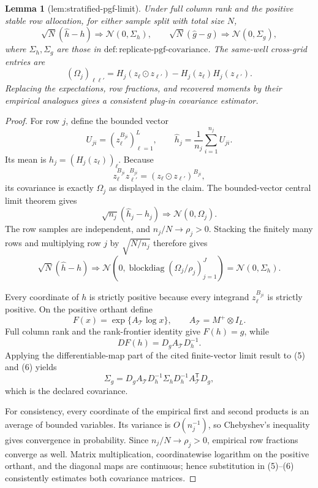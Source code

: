 \documentclass{article}
\newtheorem{lemma}{Lemma}
\begin{document}
\begin{lemma}[lem:stratified-pgf-limit]\label{lem:stratified-pgf-limit}
Under full column rank and the positive stable row allocation, for either sample split with total size \(N\),
\[
\sqrt N(\widehat h-h)\Rightarrow\mathcal N(0,\Sigma_h),
\qquad
\sqrt N(\widehat g-g)\Rightarrow\mathcal N(0,\Sigma_g),
\]
where \(\Sigma_h,\Sigma_g\) are those in \(\mathrm{def{:}replicate\text{-}pgf\text{-}covariance}\).  The same-well cross-grid entries are
\[
(\Omega_j)_{\ell\ell'}
=H_j(z_\ell\odot z_{\ell'})
-H_j(z_\ell)H_j(z_{\ell'}).
\]
Replacing the expectations, row fractions, and recovered moments by their empirical analogues gives a consistent plug-in covariance estimator.
\end{lemma}
\begin{proof}
For row \(j\), define the bounded vector
\[
U_{ji}=(z_\ell^{B_{ji}})_{\ell=1}^L,\qquad
\widehat h_j=\frac1{n_j}\sum_{i=1}^{n_j}U_{ji}.
\]
Its mean is \(h_j=(H_j(z_\ell))_\ell\).  Because
\[
z_\ell^{B_{ji}}z_{\ell'}^{B_{ji}}
=(z_\ell\odot z_{\ell'})^{B_{ji}},
\]
its covariance is exactly \(\Omega_j\) as displayed in the claim.  The bounded-vector central limit theorem gives
\[
\sqrt{n_j}(\widehat h_j-h_j)\Rightarrow
\mathcal N(0,\Omega_j).
\]
The row samples are independent, and \(n_j/N\to\rho_j>0\).  Stacking the finitely many rows and multiplying row \(j\) by
\(\sqrt{N/n_j}\) therefore gives
\[
\sqrt N(\widehat h-h)\Rightarrow
\mathcal N\!\left(0,
\operatorname{blockdiag}(\Omega_j/\rho_j)_{j=1}^J\right)
=\mathcal N(0,\Sigma_h). \tag{5}
\]

Every coordinate of \(h\) is strictly positive because every integrand \(z_\ell^{B_{ji}}\) is strictly positive.  On the positive orthant define
\[
F(x)=\exp\{A_{\mathcal T}\log x\},
\qquad A_{\mathcal T}=M^+\otimes I_L.
\]
Full column rank and the rank-frontier identity give \(F(h)=g\), while
\[
DF(h)=D_gA_{\mathcal T}D_h^{-1}. \tag{6}
\]
Applying the differentiable-map part of the cited finite-vector limit result to (5) and (6) yields
\[
\Sigma_g
=D_gA_{\mathcal T}D_h^{-1}\Sigma_h
D_h^{-1}A_{\mathcal T}^{\mathsf T}D_g,
\]
which is the declared covariance.

For consistency, every coordinate of the empirical first and second products is an average of bounded variables.  Its variance is \(O(n_j^{-1})\), so Chebyshev's inequality gives convergence in probability.  Since \(n_j/N\to\rho_j>0\), empirical row fractions converge as well.  Matrix multiplication, coordinatewise logarithm on the positive orthant, and the diagonal maps are continuous; hence substitution in (5)--(6) consistently estimates both covariance matrices.
\end{proof}
\end{document}
